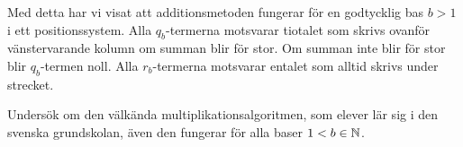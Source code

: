 Med detta har vi visat att additionsmetoden fungerar för en godtycklig bas
\(b>1\) i ett positionssystem.
Alla \(q_b\)-termerna motsvarar tiotalet som skrivs ovanför vänstervarande
kolumn om summan blir för stor.
Om summan inte blir för stor blir \(q_b\)-termen noll.
Alla \(r_b\)-termerna motsvarar entalet som alltid skrivs under strecket.

\begin{exercise}\label{xrc:MultiplikationsAlgoritm}
  Undersök om den välkända multiplikationsalgoritmen, som elever lär sig i den
  svenska grundskolan, även den fungerar för alla baser \(1<b\in\mathbb{N}\).
\end{exercise}

